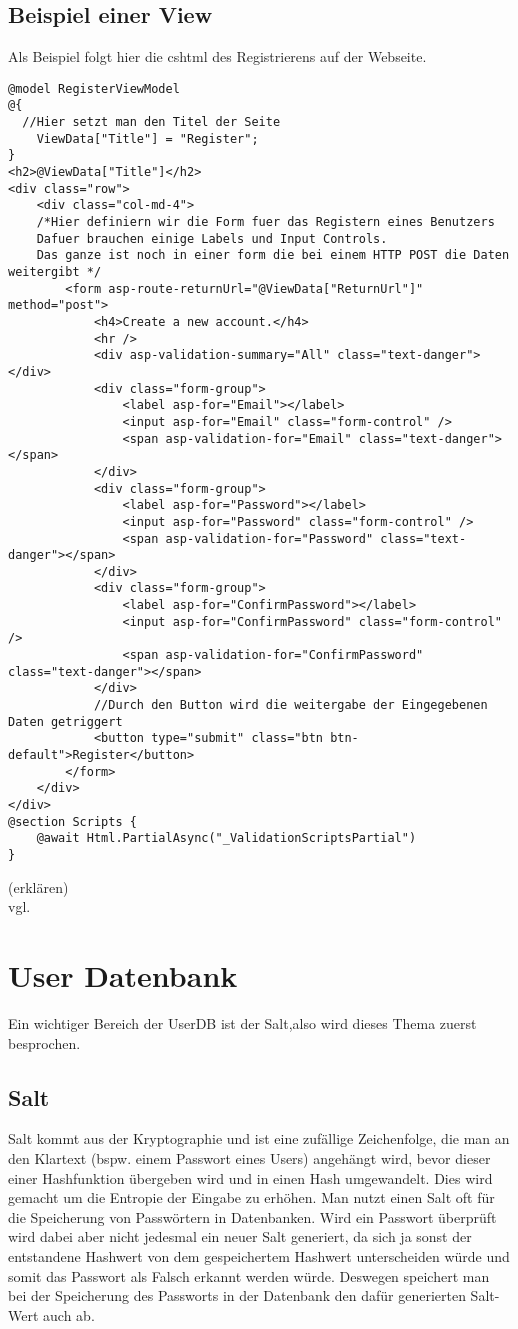 {\subsection{Beispiel einer View}
\label{mvc_view_beispiel}
Als Beispiel folgt hier die cshtml des Registrierens auf der Webseite.
\begin{lstlisting}
@model RegisterViewModel
@{
  //Hier setzt man den Titel der Seite
    ViewData["Title"] = "Register";
}
<h2>@ViewData["Title"]</h2>
<div class="row">
    <div class="col-md-4">
    /*Hier definiern wir die Form fuer das Registern eines Benutzers
    Dafuer brauchen einige Labels und Input Controls. 
    Das ganze ist noch in einer form die bei einem HTTP POST die Daten weitergibt */
        <form asp-route-returnUrl="@ViewData["ReturnUrl"]" method="post">
            <h4>Create a new account.</h4>
            <hr />
            <div asp-validation-summary="All" class="text-danger"></div>
            <div class="form-group">
                <label asp-for="Email"></label>
                <input asp-for="Email" class="form-control" />
                <span asp-validation-for="Email" class="text-danger"></span>
            </div>
            <div class="form-group">
                <label asp-for="Password"></label>
                <input asp-for="Password" class="form-control" />
                <span asp-validation-for="Password" class="text-danger"></span>
            </div>
            <div class="form-group">
                <label asp-for="ConfirmPassword"></label>
                <input asp-for="ConfirmPassword" class="form-control" />
                <span asp-validation-for="ConfirmPassword" class="text-danger"></span>
            </div>
            //Durch den Button wird die weitergabe der Eingegebenen Daten getriggert
            <button type="submit" class="btn btn-default">Register</button>
        </form>
    </div>
</div>
@section Scripts {
    @await Html.PartialAsync("_ValidationScriptsPartial")
}
\end{lstlisting}
(erklären)
\\ vgl. \textcite{mic_views}
\section{User Datenbank}
\label{sec:UserDB}
Ein wichtiger Bereich der UserDB ist der Salt,also wird dieses Thema zuerst besprochen.
\subsection{Salt}
\label{sec:salt}
Salt kommt aus der Kryptographie und ist eine zufällige Zeichenfolge, die man an den Klartext (bspw. einem Passwort eines Users) angehängt wird, bevor dieser einer Hashfunktion übergeben wird und in einen Hash umgewandelt. Dies wird gemacht um die Entropie der Eingabe zu erhöhen. Man nutzt einen Salt oft für die Speicherung von Passwörtern in Datenbanken. Wird ein Passwort überprüft wird dabei aber nicht jedesmal ein neuer Salt generiert, da sich ja sonst der entstandene Hashwert von dem gespeichertem Hashwert unterscheiden würde und somit das Passwort als Falsch erkannt werden würde. Deswegen speichert man bei der Speicherung des Passworts in der Datenbank den dafür generierten Salt-Wert auch ab.
}
